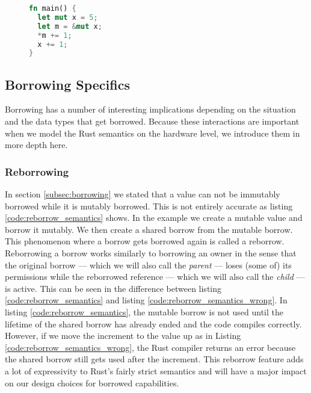 \begin{figure}[h]
\begin{lstlisting}[language=Rust,frame=single,caption=Semantic lifetimes,label=code:semantic_lifetime]
fn main() {
  let mut x = 5;
  let m = &mut x;
  *m += 1;
  x += 1;
}
\end{lstlisting}
\end{figure}

\subsection{Borrowing Specifics}
Borrowing has a number of interesting implications depending on the situation and the data types that get borrowed.
Because these interactions are important when we model the Rust semantics on the hardware level, we introduce them in more depth here.

\subsubsection{Reborrowing}
\label{sec:backgroundreborrow}
In section \ref{subsec:borrowing} we stated that a value can not be immutably borrowed while it is mutably borrowed.
This is not entirely accurate as listing \ref{code:reborrow_semantics} shows.
In the example we create a mutable value and borrow it mutably.
We then create a shared borrow from the mutable borrow.
This phenomenon where a borrow gets borrowed again is called a reborrow.
Reborrowing a borrow works similarly to borrowing an owner in the sense that the original borrow --- which we will also call the \textit{parent} --- loses (some of) its permissions while the reborrowed reference --- which we will also call the \textit{child} --- is active.
This can be seen in the difference between listing \ref{code:reborrow_semantics} and listing \ref{code:reborrow_semantics_wrong}.
In listing \ref{code:reborrow_semantics}, the mutable borrow is not used until the lifetime of the shared borrow has already ended and the code compiles correctly.
However, if we move the increment to the value up as in Listing \ref{code:reborrow_semantics_wrong}, the Rust compiler returns an error because the shared borrow still gets used after the increment.
This reborrow feature adds a lot of expressivity to Rust's fairly strict semantics and will have a major impact on our design choices for borrowed capabilities.

